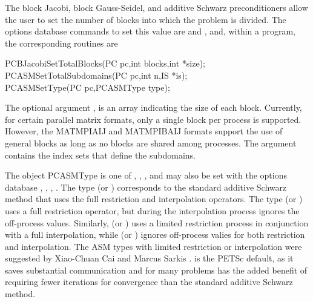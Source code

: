 The block Jacobi, block Gauss-Seidel, and additive Schwarz
preconditioners allow the user
to set the number of blocks into which the problem is divided.  The
options database commands to set this value are  
and  , and, within a program, the corresponding routines
are  
 
\begin{tabbing}
  PCBJacobiSetTotalBlocks(PC pc,int blocks,int *size);\\
  PCASMSetTotalSubdomains(PC pc,int n,IS *is);\\
  PCASMSetType(PC pc,PCASMType type);
\end{tabbing}
The
optional argument , is an array indicating the size of
each block. Currently, for certain parallel matrix formats, only a
single block per process is supported. However, the MATMPIAIJ and
MATMPIBAIJ formats
support the use of general blocks as long as no blocks are shared
among processes. The  argument contains the index sets that
define the subdomains.

The object PCASMType is one of ,
, , 
and may also be set with the options database
 \trl{[basic}, , , \trl{none]}.
  
  
The type  (or  ) corresponds to the
standard additive Schwarz method that uses the full restriction and
interpolation operators.
The type  (or  ) uses a full
restriction operator, but during the interpolation process ignores the off-process
values.
Similarly,  (or  ) uses a limited
restriction process in conjunction with a full interpolation, while
 (or  ) ignores off-process valies
for both restriction and interpolation.
The ASM types with limited restriction or interpolation were suggested by
Xiao-Chuan Cai and Marcus Sarkis \cite{cs97a}.    
 is the PETSc default, as it saves substantial communication
and for many problems has the added benefit of requiring fewer iterations for convergence
than the standard additive Schwarz method.

